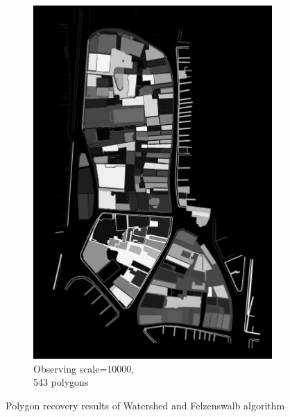 \documentclass[12pt]{article}
\begin{document}
\begin{figure}[H]
\begin{subfigure}[b]{.3\textwidth}
		\includegraphics[width=1\linewidth]{images/polygon_recovery/felzenswalb1_scale10000_region543.png}  
		\caption{Observing scale=10000, \\ 543 polygons}
	\end{subfigure}
	
	\caption{Polygon recovery results of Watershed and Felzenswalb algorithm}
	\label{fig:watershed1}
\end{figure}
\end{document}
